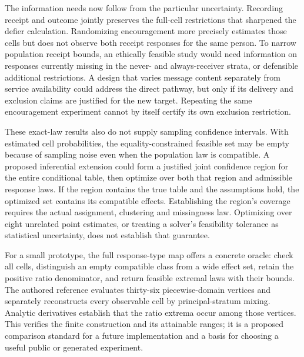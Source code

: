 The information needs now follow from the particular uncertainty.
Recording receipt and outcome jointly preserves the full-cell restrictions
that sharpened the defier calculation. Randomizing encouragement more
precisely estimates those cells but does not observe both receipt
responses for the same person. To narrow population receipt bounds, an
ethically feasible study would need information on responses currently
missing in the never- and always-receiver strata, or defensible additional
restrictions. A design that varies message content separately from service
availability could address the direct pathway, but only if its delivery
and exclusion claims are justified for the new target. Repeating the
same encouragement experiment cannot by itself certify its own exclusion
restriction.

These exact-law results also do not supply sampling confidence intervals.
With estimated cell probabilities, the equality-constrained feasible set
may be empty because of sampling noise even when the population law is
compatible. A proposed inferential extension could form a justified joint
confidence region for the entire conditional table, then optimize over
both that region and admissible response laws. If the region contains
the true table and the assumptions hold, the optimized set contains its
compatible effects. Establishing the region's coverage requires the actual
assignment, clustering and missingness law. Optimizing over eight unrelated
point estimates, or treating a solver's feasibility tolerance as statistical
uncertainty, does not establish that guarantee.

For a small prototype, the full response-type map offers a concrete oracle:
check all cells, distinguish an empty compatible class from a wide effect
set, retain the positive ratio denominator, and return feasible extremal
laws with their bounds. The authored reference evaluates thirty-six
piecewise-domain vertices and separately reconstructs every observable
cell by principal-stratum mixing. Analytic derivatives establish that
the ratio extrema occur among those vertices. This verifies the finite
construction and its attainable ranges; it is a proposed comparison
standard for a future implementation and a basis for choosing a useful
public or generated experiment.~\citep{exec17_s3_sensitivity}
\label{exec17:s3-sensitivity-end}
